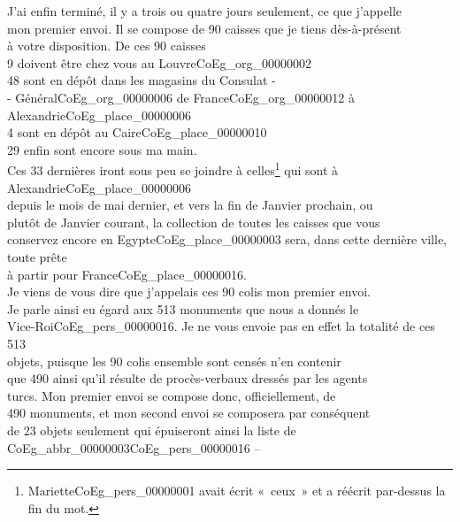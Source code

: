 \documentclass{book}
\begin{document}
\indent J’ai enfin terminé, il y a trois ou quatre jours seulement, ce que j’appelle\\
mon premier envoi. Il se compose de 90 caisses que je tiens dès-à-présent\\
à votre disposition. De ces 90 caisses\\
\hspace*{2cm} 9 doivent être chez vous au Louvre\gls{CoEg_org_00000002}\\
\hspace*{2cm} 48 sont en dépôt dans les magasins du Consulat -\\
\hspace*{4cm} - Général\gls{CoEg_org_00000006} de France\gls{CoEg_org_00000012} à Alexandrie\gls{CoEg_place_00000006}\\
\hspace*{2cm} 4 sont en dépôt au Caire\gls{CoEg_place_00000010}\\
\hspace*{2cm} 29 enfin sont encore sous ma main.\\
\indent Ces 33 dernières iront sous peu se joindre à celles\footnote{Mariette\gls{CoEg_pers_00000001} avait écrit «~ceux~» et a réécrit par-dessus la fin du mot.} qui sont à Alexandrie\gls{CoEg_place_00000006}\\
depuis le mois de mai dernier, et vers la fin de Janvier prochain, ou\\
plutôt de Janvier courant, la collection de toutes les caisses que vous\\
conservez encore en Egypte\gls{CoEg_place_00000003} sera, dans cette dernière ville, toute prête\\
à partir pour France\gls{CoEg_place_00000016}.\\
\indent Je viens de vous dire que j’appelais ces 90 colis mon premier envoi.\\
Je parle ainsi eu égard aux 513 monuments que nous a donnés le\\
Vice-Roi\gls{CoEg_pers_00000016}. Je ne vous envoie pas en effet la totalité de ces 513\\
objets, puisque les 90 colis ensemble sont censés n’en contenir\\
que 490 ainsi qu’il résulte de procès-verbaux dressés par les agents\\
turcs. Mon premier envoi se compose donc, officiellement, de\\
490 monuments, et mon second envoi se composera par conséquent\\
de 23 objets seulement qui épuiseront ainsi la liste de \gls{CoEg_abbr_00000003}\gls{CoEg_pers_00000016} –\\
\end{document}

